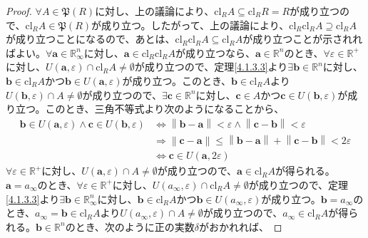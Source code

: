 \documentclass[dvipdfmx]{jsarticle}
\begin{document}
\begin{proof}
$\forall A \in \mathfrak{P}(R)$に対し、上の議論により、$\mathrm{cl}_{R}A \subseteq \mathrm{cl}_{R}R = R$が成り立つので、$\mathrm{cl}_{R}A\in \mathfrak{P}(R)$が成り立つ。したがって、上の議論により、$\mathrm{cl}_{R}{\mathrm{cl}_{R}A} \supseteq \mathrm{cl}_{R}A$が成り立つことになるので、あとは、$\mathrm{cl}_{R}{\mathrm{cl}_{R}A} \subseteq \mathrm{cl}_{R}A$が成り立つことが示されればよい。$\forall\mathbf{a} \in \mathbb{R}_{\infty}^{n}$に対し、$\mathbf{a} \in \mathrm{cl}_{R}{\mathrm{cl}_{R}A}$が成り立つなら、$\mathbf{a} \in \mathbb{R}^{n}$のとき、$\forall\varepsilon \in \mathbb{R}^{+}$に対し、$U\left( \mathbf{a},\varepsilon \right) \cap \mathrm{cl}_{R}A \neq \emptyset$が成り立つので、定理\ref{4.1.3.3}より$\exists\mathbf{b} \in \mathbb{R}^{n}$に対し、$\mathbf{b} \in \mathrm{cl}_{R}A$かつ$\mathbf{b} \in U\left( \mathbf{a},\varepsilon \right)$が成り立つ。このとき、$\mathbf{b} \in \mathrm{cl}_{R}A$より$U\left( \mathbf{b},\varepsilon \right) \cap A \neq \emptyset$が成り立つので、$\exists\mathbf{c} \in \mathbb{R}^{n}$に対し、$\mathbf{c} \in A$かつ$\mathbf{c} \in U\left( \mathbf{b},\varepsilon \right)$が成り立つ。このとき、三角不等式より次のようになることから、
\begin{align*}
\mathbf{b} \in U\left( \mathbf{a},\varepsilon \right) \land \mathbf{c} \in U\left( \mathbf{b},\varepsilon \right) &\Leftrightarrow \left\| \mathbf{b} - \mathbf{a} \right\| < \varepsilon \land \left\| \mathbf{c} - \mathbf{b} \right\| < \varepsilon\\
&\Rightarrow \left\| \mathbf{c} - \mathbf{a} \right\| \leq \left\| \mathbf{b} - \mathbf{a} \right\| + \left\| \mathbf{c} - \mathbf{b} \right\| < 2\varepsilon\\
&\Leftrightarrow \mathbf{c} \in U\left( \mathbf{a},2\varepsilon \right)
\end{align*}
$\forall\varepsilon \in \mathbb{R}^{+}$に対し、$U\left( \mathbf{a},\varepsilon \right) \cap A \neq \emptyset$が成り立つので、$\mathbf{a} \in \mathrm{cl}_{R}A$が得られる。$\mathbf{a} = a_{\infty}$のとき、$\forall\varepsilon \in \mathbb{R}^{+}$に対し、$U\left( a_{\infty},\varepsilon \right) \cap \mathrm{cl}_{R}A \neq \emptyset$が成り立つので、定理\ref{4.1.3.3}より$\exists\mathbf{b} \in \mathbb{R}_{\infty}^{n}$に対し、$\mathbf{b} \in \mathrm{cl}_{R}A$かつ$\mathbf{b} \in U\left( a_{\infty},\varepsilon \right)$が成り立つ。$\mathbf{b} = a_{\infty}$のとき、$a_{\infty} = \mathbf{b} \in \mathrm{cl}_{R}A$より$U\left( a_{\infty},\varepsilon \right) \cap A \neq \emptyset$が成り立つので、$a_{\infty} \in \mathrm{cl}_{R}A$が得られる。$\mathbf{b} \in \mathbb{R}^{n}$のとき、次のように正の実数$\delta$がおかれれば、

\end{proof}
\end{document}
